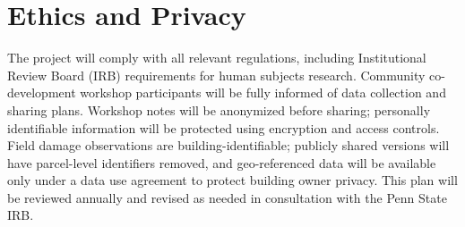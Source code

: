 \documentclass[11pt]{article}
\begin{document}
\vspace{0.3cm}
\section{Ethics and Privacy}
The project will comply with all relevant regulations, including Institutional Review
Board (IRB) requirements for human subjects research.
Community co-development workshop participants will be fully informed of data
collection and sharing plans.
Workshop notes will be anonymized before sharing; personally identifiable information
will be protected using encryption and access controls.
Field damage observations are building-identifiable; publicly shared versions will
have parcel-level identifiers removed, and geo-referenced data will be available only
under a data use agreement to protect building owner privacy.
This plan will be reviewed annually and revised as needed in consultation with the
Penn State IRB.
\end{document}
